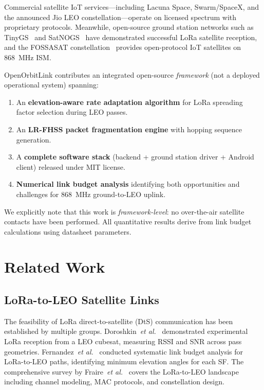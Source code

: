 \documentclass[11pt,a4paper]{article}
\begin{document}
Commercial satellite IoT services---including Lacuna Space, Swarm/SpaceX, and the announced Jio LEO constellation---operate on licensed spectrum with proprietary protocols. Meanwhile, open-source ground station networks such as TinyGS~\cite{tinygs} and SatNOGS~\cite{satnogs} have demonstrated successful LoRa satellite reception, and the FOSSASAT constellation~\cite{fossasat} provides open-protocol IoT satellites on 868~MHz ISM.

OpenOrbitLink contributes an integrated open-source \emph{framework} (not a deployed operational system) spanning:

\begin{enumerate}
    \item An \textbf{elevation-aware rate adaptation algorithm} for LoRa spreading factor selection during LEO passes.
    \item An \textbf{LR-FHSS packet fragmentation engine} with hopping sequence generation.
    \item A \textbf{complete software stack} (backend + ground station driver + Android client) released under MIT license.
    \item \textbf{Numerical link budget analysis} identifying both opportunities and challenges for 868~MHz ground-to-LEO uplink.
\end{enumerate}

We explicitly note that this work is \emph{framework-level}: no over-the-air satellite contacts have been performed. All quantitative results derive from link budget calculations using datasheet parameters.

\section{Related Work}
\label{sec:related}

\subsection{LoRa-to-LEO Satellite Links}

The feasibility of LoRa direct-to-satellite (DtS) communication has been established by multiple groups. Doroshkin~\emph{et al.}~\cite{doroshkin2019} demonstrated experimental LoRa reception from a LEO cubesat, measuring RSSI and SNR across pass geometries. Fernandez~\emph{et al.}~\cite{fernandez2020} conducted systematic link budget analysis for LoRa-to-LEO paths, identifying minimum elevation angles for each SF. The comprehensive survey by Fraire~\emph{et al.}~\cite{fraire2022} covers the LoRa-to-LEO landscape including channel modeling, MAC protocols, and constellation design.
\end{document}
